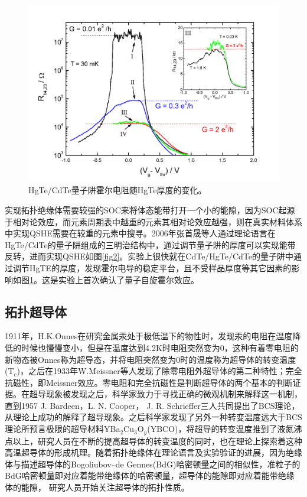 \begin{figure}[h]
\centering
\includegraphics[scale=0.3]{pic/fig3.png}
\caption{HgTe/CdTe量子阱霍尔电阻随HgTe厚度的变化\cite{re5}。}\label{fig3}
\end{figure}

 实现拓扑绝缘体需要较强的SOC来将体态能带打开一个小的能隙，因为SOC起源于相对论效应，而元素周期表中越重的元素其相对论效应越强，则在真实材料体系中实现QSHE需要在较重的元素中搜寻。2006年张首晟等人通过理论语言在HgTe/CdTe的量子阱组成的三明治结构中，通过调节量子阱的厚度可以实现能带反转，进而实现QSHE如图\ref{fig2}\cite{re4}。实验上很快就在CdTe/HgTe/CdTe的量子阱中通过调节HgTE的厚度，发现霍尔电导的稳定平台，且不受样品厚度等其它因素的影响如图\ref{fig3}\cite{re5}。这是实验上首次确认了量子自旋霍尔效应。
\subsection{拓扑超导体}
  1911年，H.K.Onnes在研究金属汞处于极低温下的物性时，发现汞的电阻在温度降低的时候也慢慢变小，但是在温度达到4.2K时电阻突然变为0\cite{re7}，这种有着零电阻的新物态被Onnes称为超导态，并将电阻突然变为0时的温度称为超导体的转变温度(T$_c$)，之后在1933年W.Meissner等人发现了除零电阻外超导体的第二种特性；完全抗磁性，即Meissner效应\cite{re8}。零电阻和完全抗磁性是判断超导体的两个基本的判断证据。在超导现象被发现之后，科学家致力于寻找正确的微观机制来解释这一机制，直到1957 J. Bardeen，L. N. Cooper， J. R. Schrieffer三人共同提出了BCS理论\cite{re9}，从理论上成功的解释了超导现象。之后科学家发现了另外一种转变温度远大于BCS理论所预言极限的超导材料YBa$_2$Cu$_3$O$_y$(YBCO)，将超导的转变温度推到了液氮沸点以上，研究人员在不断的提高超导体的转变温度的同时，也在理论上探索着这种高温超导体的形成机理\cite{re10}。随着拓扑绝缘体在理论语言及实验验证的进展\cite{re4,re5}，因为绝缘体与描述超导体的Bogoliubov–de Gennes(BdG)哈密顿量之间的相似性，准粒子的BdG哈密顿量即对应着能带绝缘体的哈密顿量，超导体的能隙即对应着能带绝缘体的能隙， 研究人员开始关注超导体的拓扑性质\cite{re11}。

